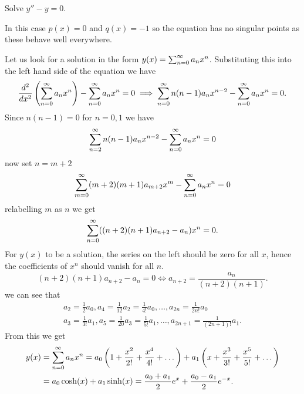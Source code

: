 \documentclass[10pt, a4paper]{article}
\begin{document}
\begin{example}
    Solve $y'' - y = 0$.

    \begin{solution}
        In this case $p(x) = 0$ and $q(x) = -1$ so the equation has no singular points as these behave well everywhere.

        Let us look for a solution in the form $y(x) = \infsum[n = 0]a_nx ^ n$.
        Substituting this into the left hand side of the equation we have
        \[
        \frac{d ^ 2}{dx ^ 2}\left(\infsum[n = 0]a_nx ^ n\right) - \infsum[n = 0]a_nx ^ n = 0 \implies \infsum[n = 0]n(n - 1)a_nx ^ {n - 2} - \infsum[n = 0]a_nx ^ n = 0.
        \]
        Since $n(n - 1) = 0$ for $n = 0, 1$ we have
        \[
        \infsum[n = 2]n(n - 1)a_nx ^ {n - 2} - \infsum[n = 0]a_nx ^ n = 0
        \]
        now set $n = m + 2$
        \[
        \infsum[m = 0](m + 2)(m + 1)a_{m + 2}x ^ {m} - \infsum[n = 0]a_nx ^ n = 0
        \]
        relabelling $m$ as $n$ we get
        \[
        \infsum[n = 0]((n + 2)(n + 1)a_{n + 2} - a_n)x ^ n = 0.
        \]
        For $y(x)$ to be a solution,
        the series on the left should be zero for all $x$,
        hence the coefficients of $x ^ n$ should vanish for all $n$.
        \[
        (n + 2)(n + 1)a_{n + 2} - a_n = 0 \iff a_{n + 2} = \frac{a_n}{(n + 2)(n + 1)}.
        \]
        we can see that
        \begin{gather*}
            a_2 = \frac{1}{2}a_0, a_4 = \frac{1}{12}a_2 = \frac{1}{4!}a_0, \dotsc, a_{2n} = \frac{1}{2n!}a_0 \\
            a_3 = \frac{1}{3!}a_1, a_5 = \frac{1}{20}a_3 = \frac{1}{5!}a_1, \dotsc, a_{2n + 1} = \frac{1}{(2n + 1)!}a_1.
        \end{gather*}
        From this we get
        \begin{align*}
            y(x) &= \infsum[n = 0]a_nx ^ n = a_0\left(1 + \frac{x ^ 2}{2!} + \frac{x ^ 4}{4!} + \dotsc\right) + a_1\left(x + \frac{x ^ 3}{3!} + \frac{x ^ 5}{5!} + \dotsc\right) \\
            &= a_0\cosh(x) + a_1\sinh(x) = \frac{a_0 + a_1}{2}e ^ x + \frac{a_0 - a_1}{2}e ^ {-x}.
        \end{align*}
    \end{solution}
\end{example}
\end{document}
